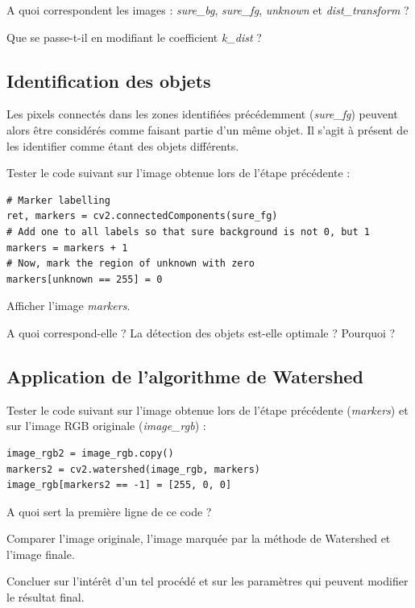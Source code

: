\documentclass[a4paper,11pt,titlepage]{article} %
\begin{document}
\Quest A quoi correspondent les images : \textsl{sure\_bg}, \textsl{sure\_fg}, \textsl{unknown} et \textsl{dist\_transform} ?

\Quest Que se passe-t-il en modifiant le coefficient \textsl{k\_dist} ?

\subsection{Identification des objets}

Les pixels connectés dans les zones identifiées précédemment (\textsl{sure\_fg}) peuvent alors être considérés comme faisant partie d'un même objet. Il s'agit à présent de les identifier comme étant des objets différents.

\Manip Tester le code suivant sur l'image obtenue lors de l'étape précédente :

\begin{lstlisting}
# Marker labelling
ret, markers = cv2.connectedComponents(sure_fg)
# Add one to all labels so that sure background is not 0, but 1
markers = markers + 1
# Now, mark the region of unknown with zero
markers[unknown == 255] = 0
\end{lstlisting}

\Manip Afficher l'image \textsl{markers}.

\Quest A quoi correspond-elle ? La détection des objets est-elle optimale ? Pourquoi ?

\subsection{Application de l'algorithme de Watershed}

\Manip Tester le code suivant sur l'image obtenue lors de l'étape précédente (\textsl{markers}) et sur l'image RGB originale (\textsl{image\_rgb}) :

\begin{lstlisting}
image_rgb2 = image_rgb.copy()
markers2 = cv2.watershed(image_rgb, markers)
image_rgb[markers2 == -1] = [255, 0, 0]
\end{lstlisting}

\Quest A quoi sert la première ligne de ce code ?

\Manip Comparer l'image originale, l'image marquée par la méthode de Watershed et l'image finale.

\Quest Concluer sur l'intérêt d'un tel procédé et sur les paramètres qui peuvent modifier le résultat final.

\end{document}
